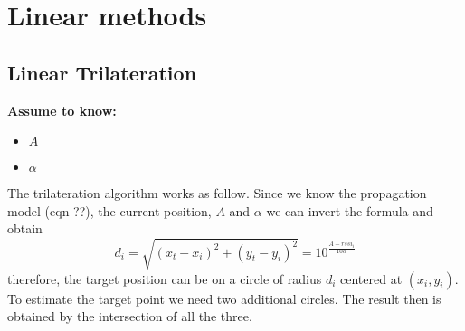 \documentclass[12pt]{report}
\begin{document}
\section{Linear methods}
\subsection{Linear Trilateration}

  \begin{center}
  \textbf{Assume to know:}
  \begin{itemize}
    \centering
    \item $A$
    \item $\alpha$
  \end{itemize}
  \end{center}
The trilateration algorithm works as follow. Since we know the propagation model (eqn ??), the current position, $A$ and $\alpha$ we can invert the formula and obtain
\begin{equation}
    d_i=\sqrt{(x_t-x_i)^2+(y_t-y_i)^2}=10^{\frac{A-rssi_i}{10\alpha}}    
\end{equation}
therefore, the target position can be on a circle of radius $d_i$ centered at $(x_i,y_i)$. 
To estimate the target point we need two additional circles. The result then is obtained by the intersection of all the three.
\begin{center}
\end{center}
\end{document}
